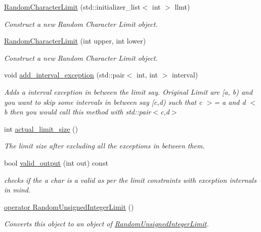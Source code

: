 \begin{DoxyCompactItemize}
\item 
\hyperlink{classtestcaser_1_1maker_1_1RandomCharacterLimit_a2ebd894bf7f536219bf7a917ed036c55}{Random\+Character\+Limit} (std\+::initializer\+\_\+list$<$ int $>$ llmt)
\begin{DoxyCompactList}\small\item\em Construct a new Random Character Limit object. \end{DoxyCompactList}\item 
\hyperlink{classtestcaser_1_1maker_1_1RandomCharacterLimit_a7a85c6420ec09f97e648f516a9bb68fd}{Random\+Character\+Limit} (int upper, int lower)
\begin{DoxyCompactList}\small\item\em Construct a new Random Character Limit object. \end{DoxyCompactList}\item 
void \hyperlink{classtestcaser_1_1maker_1_1RandomCharacterLimit_a9fac35205a15685a2ce671f9f38279ab}{add\+\_\+interval\+\_\+exception} (std\+::pair$<$ int, int $>$ interval)
\begin{DoxyCompactList}\small\item\em Adds a interval exception in between the limit say. Original Limit are \mbox{[}a, b) and you want to skip some intervals in between say \mbox{[}c,d) such that c $>$= a and d $<$ b then you would call this method with std\+::pair$<$c,d$>$ \end{DoxyCompactList}\item 
int \hyperlink{classtestcaser_1_1maker_1_1RandomCharacterLimit_a912c757f9c26f6ba3e3ec18db3c904c5}{actual\+\_\+limit\+\_\+size} ()
\begin{DoxyCompactList}\small\item\em The limit size after excluding all the exceptions in between them. \end{DoxyCompactList}\item 
bool \hyperlink{classtestcaser_1_1maker_1_1RandomCharacterLimit_a1b3f0a14a18aa307cf4a82f834393928}{valid\+\_\+output} (int out) const
\begin{DoxyCompactList}\small\item\em checks if the a char is a valid as per the limit constraints with exception internals in mind. \end{DoxyCompactList}\item 
\hyperlink{classtestcaser_1_1maker_1_1RandomCharacterLimit_a230a33b5d028fdef4a027f7c96663d32}{operator Random\+Unsigned\+Integer\+Limit} ()
\begin{DoxyCompactList}\small\item\em Converts this object to an object of \hyperlink{classtestcaser_1_1maker_1_1RandomUnsignedIntegerLimit}{Random\+Unsigned\+Integer\+Limit}. \end{DoxyCompactList}\end{DoxyCompactItemize}
